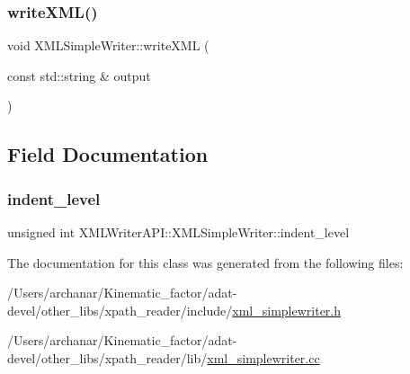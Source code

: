 \mbox{\label{classXMLWriterAPI_1_1XMLSimpleWriter_af4378ccb1442a3176f4548970f328537}} 
\subsubsection{\texorpdfstring{writeXML()}{writeXML()}\hspace{0.1cm}{\footnotesize\ttfamily [3/3]}}
{\footnotesize\ttfamily void X\+M\+L\+Simple\+Writer\+::write\+X\+ML (\begin{DoxyParamCaption}\item[{const std\+::string \&}]{output }\end{DoxyParamCaption})}



\subsection{Field Documentation}
\mbox{\label{classXMLWriterAPI_1_1XMLSimpleWriter_a61ccdacc4406db6a4a78c77a16f150da}} 
\subsubsection{\texorpdfstring{indent\_level}{indent\_level}}
{\footnotesize\ttfamily unsigned int X\+M\+L\+Writer\+A\+P\+I\+::\+X\+M\+L\+Simple\+Writer\+::indent\+\_\+level\hspace{0.3cm}{\ttfamily [protected]}}



The documentation for this class was generated from the following files\+:\begin{DoxyCompactItemize}
\item 
/\+Users/archanar/\+Kinematic\+\_\+factor/adat-\/devel/other\+\_\+libs/xpath\+\_\+reader/include/\mbox{\hyperlink{adat-devel_2other__libs_2xpath__reader_2include_2xml__simplewriter_8h}{xml\+\_\+simplewriter.\+h}}\item 
/\+Users/archanar/\+Kinematic\+\_\+factor/adat-\/devel/other\+\_\+libs/xpath\+\_\+reader/lib/\mbox{\hyperlink{adat-devel_2other__libs_2xpath__reader_2lib_2xml__simplewriter_8cc}{xml\+\_\+simplewriter.\+cc}}\end{DoxyCompactItemize}
